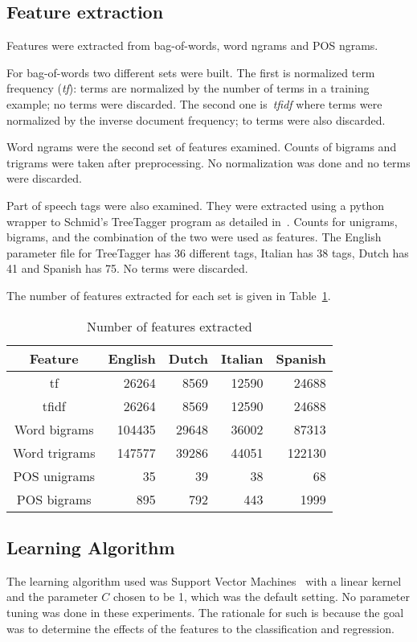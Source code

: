 \documentclass[a4paper]{llncs}
\begin{document}
\subsection{Feature extraction}
Features were extracted from bag-of-words, word ngrams and POS ngrams. 

For bag-of-words two different sets were built. The first is normalized term frequency ({\it tf}): terms are normalized by the number of terms in a training example; no terms were discarded. The second one is~\textit{tfidf} where terms were normalized by the inverse document frequency; to terms were also discarded. 


Word ngrams were the second set of features examined. Counts of bigrams and trigrams were taken after preprocessing. No normalization was done and no terms were discarded. 

Part of speech tags were also examined. They were extracted using a python wrapper to Schmid's TreeTagger program as detailed in~\cite{schmid1994probabilistic}. Counts for unigrams, bigrams, and the combination of the two were used as features. The English parameter file for TreeTagger has 36 different tags, Italian has 38 tags, Dutch has 41 and Spanish has 75. No terms were discarded.

The number of features extracted for each set is given in Table~\ref{table:numFeatures}.
\begin{table}[!htbp]
  \centering
  \caption{Number of features extracted}
  \label{table:numFeatures}
  \begin{tabular}{crrrr}
    \toprule
    Feature       & English & Dutch & Italian & Spanish \\
    \midrule
    tf            & 26264   & 8569  & 12590   & 24688   \\ %
    tfidf         & 26264   & 8569  & 12590   & 24688   \\ %
    Word bigrams  & 104435  & 29648 & 36002   & 87313   \\ %
    Word trigrams & 147577  & 39286 & 44051   & 122130  \\ %
    POS unigrams  & 35      & 39    & 38      & 68      \\ %
    POS bigrams   & 895     & 792   & 443     & 1999    \\ 
    \bottomrule
  \end{tabular}
\end{table}




\subsection{Learning Algorithm}
The learning algorithm used was Support Vector Machines~\cite{cortes1995support} with a linear kernel and the parameter $C$ chosen to be 1, which was the default setting. No parameter tuning was done in these experiments. The rationale for such is because the goal was to determine the effects of the features to the classification and regression.  
\end{document}
